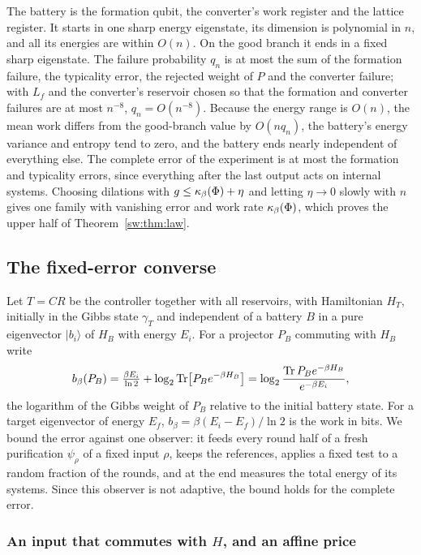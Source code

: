 The battery is the formation qubit, the converter's work register and the lattice register. It starts in one sharp energy eigenstate, its dimension is polynomial in $n$, and all its energies are within $O(n)$. On the good branch it ends in a fixed sharp eigenstate. The failure probability $q_n$ is at most the sum of the formation failure, the typicality error, the rejected weight of $P$ and the converter failure; with $L_f$ and the converter's reservoir chosen so that the formation and converter failures are at most $n^{-8}$, $q_n=O(n^{-8})$. Because the energy range is $O(n)$, the mean work differs from the good-branch value by $O(nq_n)$, the battery's energy variance and entropy tend to zero, and the battery ends nearly independent of everything else. The complete error of the experiment is at most the formation and typicality errors, since everything after the last output acts on internal systems. Choosing dilations with $g\le\kappa_\beta(\Phi)+\eta$ and letting $\eta\to0$ slowly with $n$ gives one family with vanishing error and work rate $\kappa_\beta(\Phi)$, which proves the upper half of Theorem~\ref{sw:thm:law}.

\subsection{The fixed-error converse}\label{sw:app:fixed-error}

Let $T=CR$ be the controller together with all reservoirs, with Hamiltonian $H_T$, initially in the Gibbs state $\gamma_T$ and independent of a battery $B$ in a pure eigenvector $|b_i\rangle$ of $H_B$ with energy $E_i$. For a projector $P_B$ commuting with $H_B$ write
\[
b_\beta(P_B)=\tfrac{\beta E_i}{\ln2}+\log_2\operatorname{Tr}\bigl[P_Be^{-\beta H_B}\bigr]=\log_2\frac{\operatorname{Tr} P_Be^{-\beta H_B}}{e^{-\beta E_i}},
\]
the logarithm of the Gibbs weight of $P_B$ relative to the initial battery state. For a target eigenvector of energy $E_f$, $b_\beta=\beta(E_i-E_f)/\ln2$ is the work in bits. We bound the error against one observer: it feeds every round half of a fresh purification $\psi_\rho$ of a fixed input $\rho$, keeps the references, applies a fixed test to a random fraction of the rounds, and at the end measures the total energy of its systems. Since this observer is not adaptive, the bound holds for the complete error.

\subsubsection{\texorpdfstring{An input that commutes with $H$, and an affine price}{An input that commutes with H, and an affine price}}

